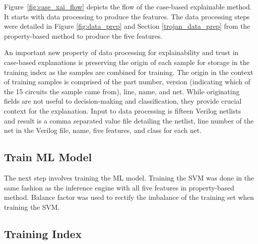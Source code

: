 Figure~\ref{fig:case_xai_flow} depicts the flow of the case-based explainable
method. It starts with data processing to produce the features. The data
processing steps were detailed in Figure \ref{fig:data_prep} and Section
\ref{trojan_data_prep} from the property-based method to produce the five
features.

An important new property of data processing for explainability and trust in
case-based explanations is preserving the origin of each sample for storage in
the training index as the samples are combined for training.  The origin in the
context of training samples is comprised of the part number, version (indicating
which of the 15 circuits the sample came from), line, name, and net.  While
originating fields are not useful to decision-making and classification, they
provide crucial context for the explanation. Input to data processing is fifteen
Verilog netlists and result is a comma separated value file detailing the
netlist, line number of the net in the Verilog file, name, five features, and
class for each net.


\subsection{Train ML Model}

The next step involves training the ML model. Training the SVM was done in the
same fashion as the inference engine with all five features in property-based
method. Balance factor was used to rectify the imbalance of the training set
when training the SVM.

\subsection{Training Index}

